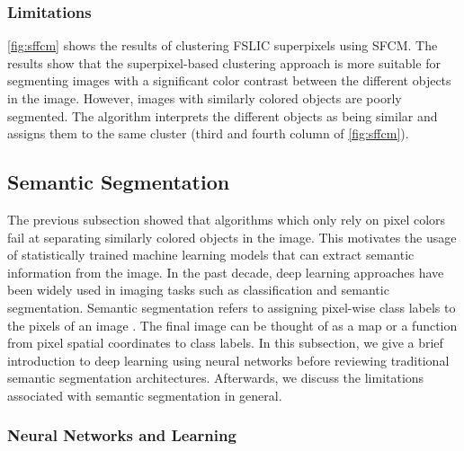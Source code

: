 \subsubsection{Limitations}

\autoref{fig:sffcm} shows the results of clustering FSLIC superpixels using SFCM. The results show that the superpixel-based clustering approach is more suitable for segmenting images with a significant color contrast between the different objects in the image. However, images with similarly colored objects are poorly segmented. The algorithm interprets the different objects as being similar and assigns them to the same cluster (third and fourth column of \autoref{fig:sffcm}).

\subsection{Semantic Segmentation}

The previous subsection showed that algorithms which only rely on pixel colors fail at separating similarly colored objects in the image. This motivates the usage of statistically trained machine learning models that can extract semantic information from the image. In the past decade, deep learning approaches have been widely used in imaging tasks such as classification and semantic segmentation. Semantic segmentation refers to assigning pixel-wise class labels to the pixels of an image \parencite{minaee2021image}. The final image can be thought of as a map or a function from pixel spatial coordinates to class labels. In this subsection, we give a brief introduction to deep learning using neural networks before reviewing traditional semantic segmentation architectures. Afterwards, we discuss the limitations associated with semantic segmentation in general.

\subsubsection{Neural Networks and Learning}

